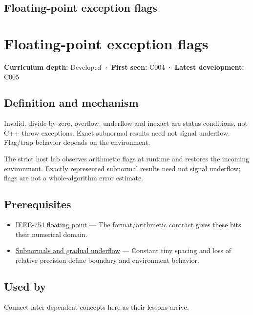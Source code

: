 \hypertarget{appendix-ed8531b46754}{}
\section*{Floating-point exception flags}
\chapter{Floating-point exception flags}\label{appendix-ed8531b46754-floating-point-exception-flags}

\textbf{Curriculum depth:} Developed · \textbf{First seen:} C004 · \textbf{Latest development:} C005

\section{Definition and mechanism}\label{appendix-ed8531b46754-definition-and-mechanism}

Invalid, divide-by-zero, overflow, underflow and inexact are status conditions, not C++ throw exceptions. Exact subnormal results need not signal underflow. Flag/trap behavior depends on the environment.

The strict host lab observes arithmetic flags at runtime and restores the incoming environment. Exactly represented subnormal results need not signal underflow; flags are not a whole-algorithm error estimate.

\section{Prerequisites}\label{appendix-ed8531b46754-prerequisites}

\begin{itemize}
\tightlist
\item
  \hyperref[appendix-343615f49ddf]{IEEE-754 floating point} --- The format/arithmetic contract gives these bits their numerical domain.
\item
  \hyperref[appendix-00a6e044c437]{Subnormals and gradual underflow} --- Constant tiny spacing and loss of relative precision define boundary and environment behavior.
\end{itemize}

\section{Used by}\label{appendix-ed8531b46754-used-by}

Connect later dependent concepts here as their lessons arrive.

